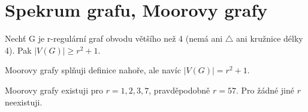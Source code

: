 \section{\texorpdfstring{Spekrum grafu, Moorovy grafy}{Spekrum grafu, Moorovy grafy}}
\vspace{5mm}
\large

\begin{definition}
Nechť G je r-regulární graf obvodu většího než 4 (nemá ani $\triangle$ ani kružnice délky 4). Pak $|V(G)| \geq r^2 + 1$.
\end{definition}
\begin{definition}
Moorovy grafy splňuji definice nahoře, ale navíc $|V(G)| = r^2 + 1$.
\end{definition}

\begin{theorem}
	Moorovy grafy existuji pro $r = 1,2,3,7$, pravděpodobně $r = 57$. Pro žádné jiné $r$ neexistuji.
\end{theorem}
